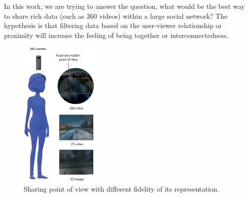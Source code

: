 
In this work, we are trying to answer the question, what would be the best way to share rich data (such as 360 videos) within a large social network? The hypothesis is that filtering data based on the user-viewer relationship or proximity will increase the feeling of being together or interconnectedness. 

\begin{figure}[ht]
	\centering
	\includegraphics[width=1.5in]{images/chi/images-04.eps}
	\caption{Sharing point of view with different fidelity of its representation.}
	\label{fig:data:sharer}
\end{figure}



